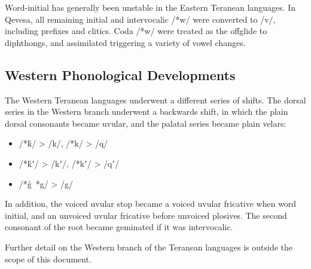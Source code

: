\documentclass[grammar]{subfiles}
\begin{document}
Word-initial  has generally been unstable in the Eastern Teranean
languages.  In Qevesa, all remaining initial and intervocalic /*w/ were
converted to /v/, including prefixes and clitics.  Coda /*w/ were treated as
the offglide to diphthongs, and assimilated triggering a variety of vowel
changes.

\Tbw
 
\subsection{Western Phonological Developments}
\label{ssec:history:western_developments}

The Western Teranean languages underwent a different series of shifts.  The
dorsal series in the Western branch underwent a backwards shift, in which the
plain dorsal consonants became uvular, and the palatal series became plain
velars: 

\begin{itemize}
  \item /*ḱ/ > /k/, /*k/ > /q/
  \item /*ḱʼ/ > /kʼ/, /*kʼ/ > /qʼ/
  \item /*ǵ~*g/ > /g/
\end{itemize}

In addition, the voiced uvular stop became a voiced uvular fricative when word
initial, and an unvoiced uvular fricative before unvoiced plosives.  The second
consonant of the root became geminated if it was intervocalic.

Further detail on the Western branch of the Teranean languages is outside the
scope of this document.

%


%
\end{document}
